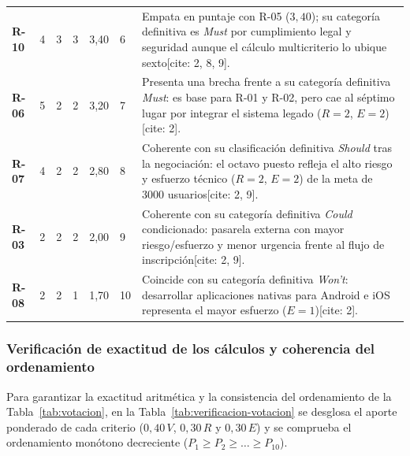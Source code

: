 \documentclass[12pt,a4paper]{article}
\begin{document}
\begin{longtable}{
    C{1.1cm}
    C{1.1cm}
    C{1.1cm}
    C{1.1cm}
    C{1.2cm}
    C{1.2cm}
    L{6.8cm}
}
\textbf{R-10} & 4 & 3 & 3 & 3{,}40 & 6 &
Empata en puntaje con R-05 ($3{,}40$); su categoría definitiva es \textit{Must} por cumplimiento legal y seguridad aunque el cálculo multicriterio lo ubique sexto[cite: 2, 8, 9]. \\

\textbf{R-06} & 5 & 2 & 2 & 3{,}20 & 7 &
Presenta una brecha frente a su categoría definitiva \textit{Must}: es base para R-01 y R-02, pero cae al séptimo lugar por integrar el sistema legado ($R=2$, $E=2$)[cite: 2]. \\

\textbf{R-07} & 4 & 2 & 2 & 2{,}80 & 8 &
Coherente con su clasificación definitiva \textit{Should} tras la negociación: el octavo puesto refleja el alto riesgo y esfuerzo técnico ($R=2$, $E=2$) de la meta de $3000$ usuarios[cite: 2, 9]. \\

\textbf{R-03} & 2 & 2 & 2 & 2{,}00 & 9 &
Coherente con su categoría definitiva \textit{Could} condicionado: pasarela externa con mayor riesgo/esfuerzo y menor urgencia frente al flujo de inscripción[cite: 2, 9]. \\

\textbf{R-08} & 2 & 2 & 1 & 1{,}70 & 10 &
Coincide con su categoría definitiva \textit{Won't}: desarrollar aplicaciones nativas para Android e iOS representa el mayor esfuerzo ($E=1$)[cite: 2]. \\

\end{longtable}

\endgroup

\subsubsection{Verificación de exactitud de los cálculos y coherencia del ordenamiento}

Para garantizar la exactitud aritmética y la consistencia del ordenamiento de la Tabla~\ref{tab:votacion}, en la Tabla~\ref{tab:verificacion-votacion} se desglosa el aporte ponderado de cada criterio ($0{,}40\,V$, $0{,}30\,R$ y $0{,}30\,E$) y se comprueba el ordenamiento monótono decreciente ($P_1 \ge P_2 \ge \dots \ge P_{10}$).

\begingroup

\small
\singlespacing
\setlength{\tabcolsep}{4pt}
\end{document}
